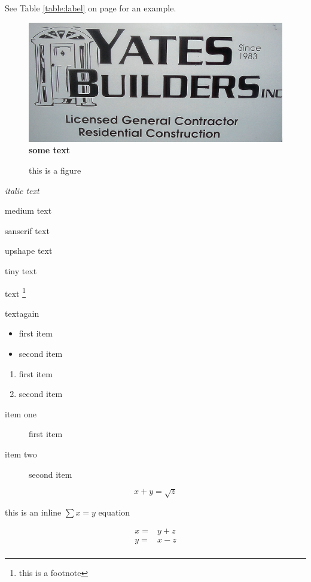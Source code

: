 \documentclass{book}
\begin{document}
\pagebreak

See Table \ref{table:label} on page \pageref{table:label} for an example.


\begin{figure}
\caption{this is a figure}\label{fig:label}
\includegraphics{somefile}
\textbf{some text}
\end{figure}



\textit{italic text}

\textmd{medium text}

\textsf{sanserif text}

\textup{upshape text}

{\tiny tiny text}

text \footnote{this is a footnote}

textagain\footnotemark{}

\begin{itemize}
\item first item
\item second item
\end{itemize}


\begin{enumerate}
\item first item
\item second item
\end{enumerate}


\begin{description}
\item[item one] first item
\item[item two] second item
\end{description}

\[
x + y = \sqrt{z}
\]

this is an inline $\sum x = y$ equation

\begin{eqnarray*}
 x = & y+z\\
 y = & x - z\\
 \end{eqnarray*}
\end{document}
